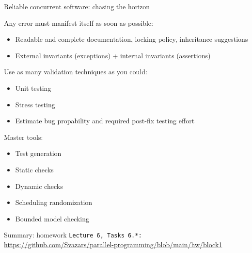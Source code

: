 \begin{frame}{Reliable concurrent software: chasing the horizon}

Any error must manifest itself as soon as possible:
\begin{itemize}
  \item Readable and complete documentation, locking policy, inheritance suggestions
  \item External invariants (exceptions) + internal invariants (assertions)
\end{itemize} 

Use as many validation techniques as you could:
\begin{itemize}
  \item Unit testing
  \item Stress testing
  \item Estimate bug propability and required post-fix testing effort
\end{itemize} 

Master tools:
\begin{itemize}
  \item Test generation
  \item Static checks
  \item Dynamic checks  
  \item Scheduling randomization
  \item Bounded model checking
\end{itemize}
\end{frame}


%
%
%
%
%
%
%
%
%
%
%
%


\begin{frame}{Summary: homework}
    \texttt{Lecture 6, Tasks 6.*:} {\tiny\url{https://github.com/Svazars/parallel-programming/blob/main/hw/block1}}
\end{frame}


